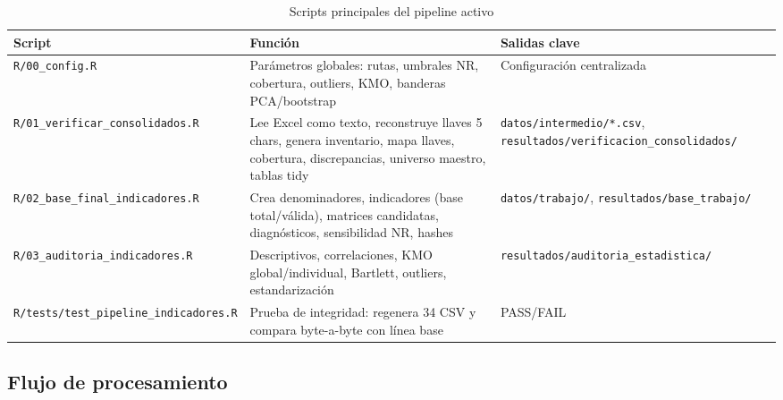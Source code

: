 \begin{table}[htbp]
\centering
\caption{Scripts principales del pipeline activo}
\label{tab:scripts_principales}
\begin{adjustbox}{max width=\textwidth}
\begin{tabular}{@{}lll@{}}
\toprule
\textbf{Script} & \textbf{Función} & \textbf{Salidas clave} \\
\midrule
\texttt{R/00\_config.R} & Parámetros globales: rutas, umbrales NR, cobertura, outliers, KMO, banderas PCA/bootstrap & Configuración centralizada \\
\texttt{R/01\_verificar\_consolidados.R} & Lee Excel como texto, reconstruye llaves 5 chars, genera inventario, mapa llaves, cobertura, discrepancias, universo maestro, tablas tidy & \texttt{datos/intermedio/*.csv}, \texttt{resultados/verificacion\_consolidados/} \\
\texttt{R/02\_base\_final\_indicadores.R} & Crea denominadores, indicadores (base total/válida), matrices candidatas, diagnósticos, sensibilidad NR, hashes & \texttt{datos/trabajo/}, \texttt{resultados/base\_trabajo/} \\
\texttt{R/03\_auditoria\_indicadores.R} & Descriptivos, correlaciones, KMO global/individual, Bartlett, outliers, estandarización & \texttt{resultados/auditoria\_estadistica/} \\
\texttt{R/tests/test\_pipeline\_indicadores.R} & Prueba de integridad: regenera 34 CSV y compara byte-a-byte con línea base & PASS/FAIL \\
\bottomrule
\end{tabular}
\end{adjustbox}
\end{table}

\subsection{Flujo de procesamiento}
\label{sec:flujo_procesamiento}

